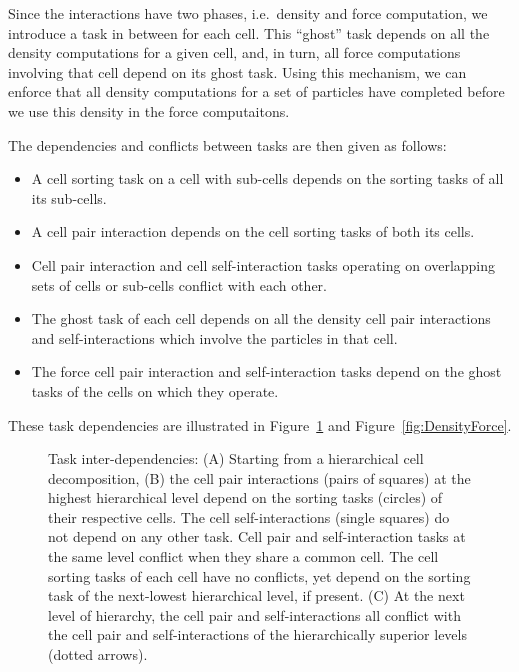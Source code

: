 \documentclass[final]{siamltex}
\newcommand{\fig}[1]
    {Figure~\ref{fig:#1}}
\begin{document}
Since the interactions have two phases, i.e.~density and force
computation, we introduce a task in between for each cell.
This ``ghost'' task depends on all the density computations
for a given cell, and, in turn, all force computations involving
that cell depend on its ghost task.
Using this mechanism, we can enforce that all density computations
for a set of particles have completed before we use this
density in the force computaitons.

The dependencies and conflicts between tasks are then given as follows:

\begin{itemize}

    \item A cell sorting task on a cell with sub-cells depends
        on the sorting tasks of all its sub-cells.

    \item A cell pair interaction depends on the cell sorting
        tasks of both its cells.
        
    \item Cell pair interaction and cell self-interaction tasks
        operating on overlapping sets of cells or sub-cells
        conflict with each other.
        
    \item The ghost task of each cell depends on all the density cell pair
        interactions and self-interactions which involve the particles
        in that cell.
        
    \item The force cell pair interaction and self-interaction tasks
        depend on the ghost tasks of the cells on which they operate.

\end{itemize}

\noindent These task dependencies are illustrated in \fig{Hierarchy} and
\fig{DensityForce}.

\begin{figure}[ht]
    \centerline{}
    
    \caption{Task inter-dependencies: ({\sf A}) Starting from a hierarchical
        cell decomposition, ({\sf B}) the cell pair interactions (pairs
        of squares) at the highest hierarchical level depend on the sorting
        tasks (circles) of their respective cells.
        The cell self-interactions (single squares) do not depend on any
        other task. Cell pair and self-interaction tasks at the
        same level conflict when they share a common cell. The
        cell sorting tasks of each cell have no conflicts, yet
        depend on the sorting task of the next-lowest hierarchical level,
        if present.
        ({\sf C)} At the next level of hierarchy, the cell pair and
        self-interactions all conflict with the cell pair and self-interactions
        of the hierarchically superior levels (dotted arrows).
        }
    \label{fig:Hierarchy}
\end{figure}
\end{document}

